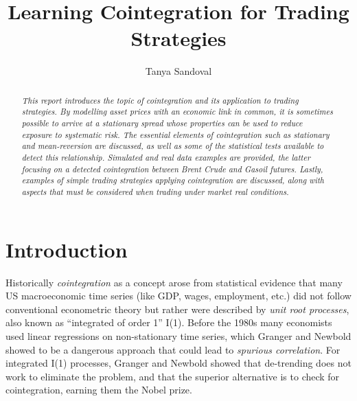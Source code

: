 \documentclass[11pt]{article}
\title{Learning Cointegration for Trading Strategies}
\author{Tanya Sandoval}
\begin{document}
    \maketitle

    \begin{abstract}
    \emph{This report introduces the topic of cointegration  and its application to trading strategies. 
    By modelling asset prices with an economic  link in common, it is sometimes possible to arrive at a stationary spread whose properties can be used to reduce exposure to systematic risk. The essential elements of cointegration such as stationary and mean-reversion are discussed, as well as some of the statistical tests available to detect this relationship. Simulated  and real data examples are provided, the latter focusing on a detected cointegration  between  Brent Crude and Gasoil futures. Lastly, examples of simple trading strategies applying cointegration are discussed, along with aspects that must be considered when trading under market real conditions. }
    \end{abstract}


           
           



    \tableofcontents


    

   
    
    \newpage


    \section{Introduction}\label{introduction}
    
    Historically  {\em cointegration} as a concept arose from statistical evidence that many US macroeconomic time series (like GDP, wages, employment, etc.) did not follow conventional econometric theory but rather were described by {\em unit root processes}, also known as  ``integrated of order 1'' I(1). Before the 1980s many economists used linear regressions on non-stationary time series, which Granger and Newbold showed to be a dangerous approach that could lead to  {\em spurious correlation}. For integrated I(1) processes, Granger and Newbold showed that de-trending does not work to eliminate the problem, and that the superior alternative is to check for cointegration, earning them the Nobel prize. 
    
\end{document}
